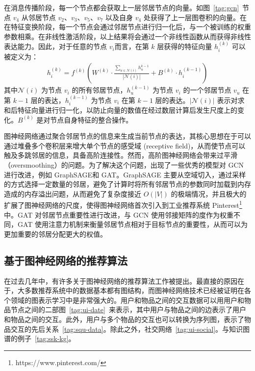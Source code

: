 在消息传播阶段，每一个节点都会获取上一层邻居节点的向量。如图~\ref{tag:gcn}~节点 $v_4$ 从邻居节点 $v_2$、$v_3$、$v_5$、$v_7$ 以及自身 $v_4$ 处获得了上一层图卷积的向量。在在特征变换阶段，每一个节点会通过邻居节点进行归一化后，与一个被训练的权重参数相乘。在非线性激活阶段，以上结果将会通过一个非线性函数从而获得非线性表达能力。因此，对于任意的节点 $v_i$而言，在第 $k$ 层获得的特征向量 $h_i^{(k)}$ 可以被定义为：
\begin{gather}
    h_i^{(k)} = f^{(k)}(W^{(k)} \cdot \frac{\sum\limits_{u\in \mathcal{N}(i)} h_u^{k-1}}{|\mathcal{N}(i)|} + B^{(k)} \cdot h_i^{(k-1)})
\end{gather}
其中$\mathcal{N}(i)$ 为节点 $v_i$ 的所有邻居节点，$h_u^{(k-1)}$ 为节点 $v_i$ 的一个邻居节点  $v_u$ 在第 $k-1$ 层的表达，$h_i^{(k-1)}$ 为节点 $v_i$ 在第 $k-1$ 层的表达。$|\mathcal{N}(i)|$ 表示对求和后特征向量进行归一化，以防止向量的数值在经过数层计算后发生尺度上的变化。$B^{(k)}$ 是对节点自身特征的整合操作。

图神经网络通过聚合邻居节点的信息来生成当前节点的表达，其核心思想在于可以通过堆叠多个卷积层来增大单个节点的感受域 (receptive field)，从而使节点可以触及多跳邻居的信息，具备高阶连接性。然而，高阶图神经网络会带来过平滑（oversmoothing）的问题\cite{chen_simple_2020}。为了解决这个问题，出现了一些优秀的模型对 GCN 进行改进，例如 GraphSAGE\cite{hamilton_inductive_2018}和 GAT\cite{velickovic_graph_2018}。GraphSAGE 主要从空域切入，通过采样的方式选择一定数量的邻居，避免了计算时将所有邻居节点的参数同时加载到内存造成的内存溢出问题，从而避免了复杂度接近 $O(|V|)$ 的极端情况，并且极大的扩展了图神经网络的尺度，使得图神经网络首次引入到工业推荐系统 Pinterest\footnote{https://www.pinterest.com/} 中。GAT 对邻居节点重要性进行改进，与 GCN 使用邻接矩阵的度作为权重不同，GAT 使用注意力机制来衡量邻居节点相对于目标节点的重要性，从而可以为更加重要的邻居分配更大的权值。

\subsection{基于图神经网络的推荐算法}
在过去几年中，有许多关于图神经网络的推荐算法工作被提出。最直接的原因在于，大多数推荐系统中的数据基本都有图结构，而图神经网络技术已经被证明在各个领域的图表示学习中是非常强大的\cite{zhou_graph_2020}。用户和物品之间的交互数据可以用用户和物品节点之间的二部图~\ref{tag:ui-date}~来表示，其中用户与物品之间的边表示了用户和物品之间的交互。此外，用户与多个物品的交互也可以转换为序列图，表示了物品交互的先后关系~\ref{tag:squ-data}。除此之外，社交网络~\ref{tag:ui-social}。与知识图谱的例子~\ref{tag:ssk-kg}。


